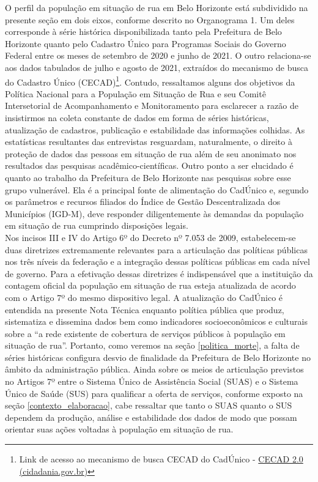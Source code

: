 \documentclass[12pt]{article}
\begin{document}
O perfil da população em situação de rua em Belo Horizonte está subdividido na presente seção em dois eixos, conforme descrito no Organograma 1. Um deles corresponde à série histórica disponibilizada tanto pela Prefeitura de Belo Horizonte quanto pelo Cadastro Único para Programas Sociais do Governo Federal entre os meses de setembro de 2020 e junho de 2021. O outro relaciona-se aos dados tabulados de julho e agosto de 2021, extraídos do mecanismo de busca do Cadastro Único (CECAD)\footnote{Link de acesso ao mecanismo de busca CECAD do CadÚnico - \href{https://cecad.cidadania.gov.br/tab_cad.php}{CECAD 2.0 (cidadania.gov.br)}}. Contudo, ressaltamos alguns dos objetivos da Política Nacional para a População em Situação de Rua e seu Comitê Intersetorial de Acompanhamento e Monitoramento para esclarecer a razão de insistirmos na coleta constante de dados em forma de séries históricas, atualização de cadastros, publicação e estabilidade das informações colhidas. As estatísticas resultantes das entrevistas resguardam, naturalmente, o direito à proteção de dados das pessoas em situação de rua além de seu anonimato nos resultados das pesquisas acadêmico-científicas. Outro ponto a ser elucidado é quanto ao trabalho da Prefeitura de Belo Horizonte nas pesquisas sobre esse grupo vulnerável. Ela é a principal fonte de alimentação do CadÚnico e, segundo os parâmetros e recursos filiados do Índice de Gestão Descentralizada dos Municípios (IGD-M), deve responder diligentemente às demandas da população em situação de rua cumprindo disposições legais.\\        

Nos incisos III e IV do Artigo 6º do Decreto nº 7.053 de 2009, estabelecem-se duas diretrizes extremamente relevantes para a articulação das políticas públicas nos três níveis da federação e a integração dessas políticas públicas em cada nível de governo. Para a efetivação dessas diretrizes é indispensável que a instituição da contagem oficial da população em situação de rua esteja atualizada de acordo com o Artigo 7º do mesmo dispositivo legal. A atualização do CadÚnico é entendida na presente Nota Técnica enquanto política pública que produz, sistematiza e dissemina dados bem como indicadores socioeconômicos e culturais sobre a ``a rede existente de cobertura de serviços públicos à população em situação de rua”. Portanto, como veremos na seção \ref{politica_morte}, a falta de séries históricas configura desvio de finalidade da Prefeitura de Belo Horizonte no âmbito da administração pública. Ainda sobre os meios de articulação previstos no Artigos 7º entre o Sistema Único de Assistência Social (SUAS) e o Sistema Único de Saúde (SUS) para qualificar a oferta de serviços, conforme exposto na seção \ref{contexto_elaboracao}, cabe ressaltar que tanto o SUAS quanto o SUS dependem da produção, análise e estabilidade dos dados de modo que possam orientar suas ações voltadas à população em situação de rua.\\
\end{document}
